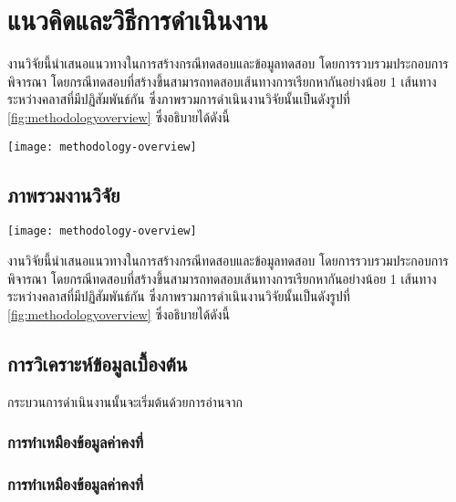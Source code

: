 \section{แนวคิดและวิธีการดำเนินงาน}

งานวิจัยนี้นำเสนอแนวทางในการสร้างกรณีทดสอบและข้อมูลทดสอบ โดยการรวบรวม{\StaticInformation}ประกอบการพิจารณา 
โดยกรณีทดสอบที่สร้างขึ้นสามารถทดสอบเส้นทางการเรียกหากันอย่างน้อย 1 เส้นทางระหว่างคลาสที่มีปฏิสัมพันธ์กัน 
ซึ่งภาพรวมการดำเนินงานวิจัยนั้นเป็นดังรูปที่ \ref{fig:methodologyoverview} ซึ่งอธิบายได้ดังนี้

\begin{sidewaysfigure}
    \centering
    \texttt{[image: methodology-overview]}
    \caption{ภาพรวมการดำเนินงานวิจัย}
    \label{fig:methodologyoverview}
\end{sidewaysfigure}


\subsection{ภาพรวมงานวิจัย}
    \begin{sidewaysfigure}
        \centering
        \texttt{[image: methodology-overview]}
        \caption[setup]{ภาพรวมการดำเนินงานวิจัย}
        \label{fig:methodologyoverview}
    \end{sidewaysfigure}

งานวิจัยนี้นำเสนอแนวทางในการสร้างกรณีทดสอบและข้อมูลทดสอบ โดยการรวบรวม{\StaticInformation}ประกอบการพิจารณา 
โดยกรณีทดสอบที่สร้างขึ้นสามารถทดสอบเส้นทางการเรียกหากันอย่างน้อย 1 เส้นทางระหว่างคลาสที่มีปฏิสัมพันธ์กัน 
ซึ่งภาพรวมการดำเนินงานวิจัยนั้นเป็นดังรูปที่ \ref{fig:methodologyoverview} ซึ่งอธิบายได้ดังนี้

\subsection{การวิเคราะห์ข้อมูลเบื้องต้น}
กระบวนการดำเนินงานนั้นจะเริ่มต้นด้วยการอ่าน{\sourcecode}จาก{\Repository}

\subsubsection{การทำเหมืองข้อมูลค่าคงที่}

\subsubsection{การทำเหมืองข้อมูลค่าคงที่}

